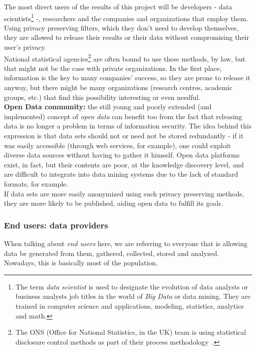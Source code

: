 The most direct users of the results of this project will be developers - data scientists\footnote{The term \textit{data scientist} is used to designate the evolution of data analysts or business analysts job titles in the world of \textit{Big Data} or data mining. They are trained in computer science and applications, modeling, statistics, analytics and math.
} -, researchers and the companies and organizations that employ them. Using privacy preserving filters, which they don’t need to develop themselves, they are allowed to release their results or their data without compromising their user’s privacy.\\

National statistical agencies\footnote{The ONS (Office for National Statistics, in the UK) team is using statistical disclosure control methods as part of their process methodology~\cite{website:sdc}.} are often bound to use these methods, by law, but that might not be the case with private organizations. In the first place, information is the key to many companies’ success, so they are prone to release it anyway, but there might be many organizations (research centres, academic groups, etc.) that find this possibility interesting or even needful.\\

\textbf{Open Data community:} the still young and poorly extended (and implemented) concept of \textit{open data} can benefit too from the fact that releasing data is no longer a problem in terms of information security. The idea behind this expression is that data sets should not or need not be stored redundantly - if it was easily accessible (through web services, for example), one could exploit diverse data sources without having to gather it himself. Open data platforms exist, in fact, but their contents are poor, at the knowledge discovery level, and are difficult to integrate into data mining systems due to the lack of standard formats, for example.\\

If data sets are more easily anonymized using such privacy preserving methods, they are more likely to be published, aiding open data to fulfill its goals.

\subsubsection{End users: data providers}

When talking about \textit{end users} here, we are referring to everyone that is allowing data be generated from them, gathered, collected, stored and analyzed. Nowadays, this is basically most of the population.\\

